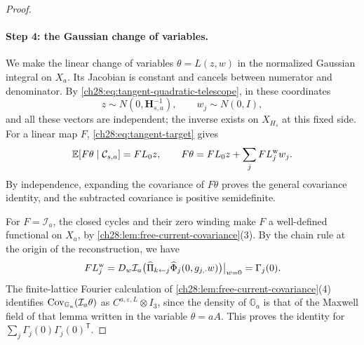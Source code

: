 \begin{proof}
\paragraph{Step 4: the Gaussian change of variables.}
We make the linear change of variables $\theta=L(z,w)$ in the normalized Gaussian integral on $X_a$. Its Jacobian is constant and cancels between numerator and denominator. By \eqref{ch28:eq:tangent-quadratic-telescope}, in these coordinates
\[
 z\sim N(0,\mathbf H_{s,a}^{-1}),\qquad w_j\sim N(0,I),
\]
and all these vectors are independent; the inverse exists on $X_{H_s}$ at this fixed side. For a linear map $F$, \eqref{ch28:eq:tangent-target} gives
\[
 \mathbb E[F\theta\mid\mathcal C_{s,a}]=FL_0z,\qquad F\theta=FL_0z+\sum_jFL_j^{\rm w}w_j.
\]
By independence, expanding the covariance of $F\theta$ proves the general covariance identity, and the subtracted covariance is positive semidefinite.

For $F=\mathcal I_a$, the closed cycles and their zero winding make $F$ a well-defined functional on $X_a$, by \cref{ch28:lem:free-current-covariance}(3). By the chain rule at the origin of the reconstruction, we have
\[
 FL_j^{\rm w}=D_w\mathcal I_a\bigl(\widehat\Pi_{k\leftarrow j}\widehat\Phi_j(0,g_{j,\cdot}w)\bigr)\big|_{w=0}=\Gamma_j(0).
\]
The finite-lattice Fourier calculation of \cref{ch28:lem:free-current-covariance}(4) identifies $\operatorname{Cov}_{\mathbb G_a}(\mathcal I_a\theta)$ as $C^{a,\varepsilon,L}\otimes I_3$, since the density of $\mathbb G_a$ is that of the Maxwell field of that lemma written in the variable $\theta=aA$. This proves the identity for $\sum_j\Gamma_j(0)\Gamma_j(0)^{\mathsf T}$.


\end{proof}
